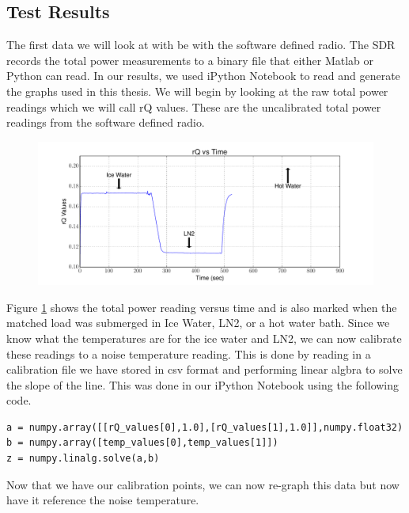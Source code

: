 \subsection{Test Results}

The first data we will look at with be with the software defined radio.  The SDR records the total power measurements to a binary file that either Matlab or Python can read.  In our results, we used iPython Notebook to read and generate the graphs used in this thesis.  We will begin by looking at the raw total power readings which we will call rQ values.  These are the uncalibrated total power readings from the software defined radio.  

\begin{figure}[h!tb] \centering

\includegraphics[width=\textwidth]{Experiments/Exp1/rqvstime_annotate.pdf}

\label{SDR_rQ}
\end{figure}

Figure \ref{SDR_rQ} shows the total power reading versus time and is also marked when the matched load was submerged in Ice Water, LN2, or a hot water bath.  Since we know what the temperatures are for the ice water and LN2, we can now calibrate these readings to a noise temperature reading.  This is done by reading in a calibration file we have stored in csv format and performing linear algbra to solve the slope of the line.  This was done in our iPython Notebook using the following code.
\lstset{language=Python}
\begin{lstlisting}[frame=single,keywordstyle=\color{blue}]
a = numpy.array([[rQ_values[0],1.0],[rQ_values[1],1.0]],numpy.float32)
b = numpy.array([temp_values[0],temp_values[1]])
z = numpy.linalg.solve(a,b)
\end{lstlisting}

Now that we have our calibration points, we can now re-graph this data but now have it reference the noise temperature. 

